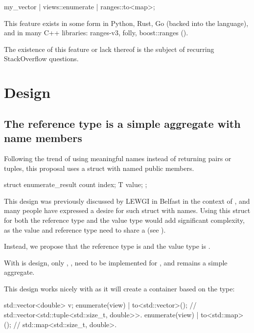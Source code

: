 \documentclass{wg21}
\begin{document}
\begin{colorblock}
my_vector | views::enumerate | ranges::to<map>;
\end{colorblock}

This feature exists in some form in Python, Rust, Go (backed into the language), and in many C++ libraries: ranges-v3, folly, boost::ranges ().


The existence of this feature or lack thereof is the subject of recurring StackOverflow questions.


\section{Design}

\subsection{The reference type is a simple aggregate with name members}

Following the trend of using meaningful names instead of returning pairs or tuples, this proposal uses a struct with named public members.
\begin{colorblock}
struct enumerate_result {
    count index;
    T value;
};
\end{colorblock}

This design was previously discussed by LEWGI in Belfast in the context of , and many people have expressed a desire for such struct with names.
Using this struct for both the reference type and the value type would add significant complexity, as the value and reference type need to share a  (see ).

Instead, we propose that the reference type is  and the value type is
.

With is design, only , ,  need to be implemented for ,
and  remains a simple aggregate.

This design works nicely with  as it will create a container based on the  type:

\begin{colorblock}
std::vector<double> v;
enumerate(view) | to<std::vector>(); // std::vector<std::tuple<std::size_t, double>>.
enumerate(view) | to<std::map>();    // std::map<std::size_t, double>.
\end{colorblock}
\end{document}
